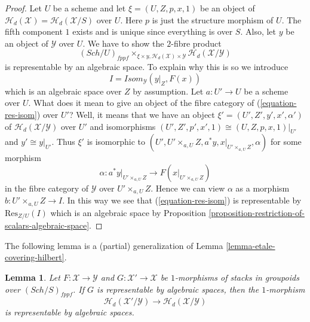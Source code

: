 \documentclass{stacks-project}
\theoremstyle{plain}
\newtheorem{lemma}[subsection]{Lemma}
\theoremstyle{definition}
\theoremstyle{remark}
\numberwithin{equation}{subsection}
\def\Sch{\mathit{Sch}}
\begin{document}
\begin{proof}
Let $U$ be a scheme and let $\xi = (U, Z, p, x, 1)$ be an object of
$\mathcal{H}_d(\mathcal{X}) = \mathcal{H}_d(\mathcal{X}/S)$ over $U$.
Here $p$ is just the structure morphism of $U$.
The fifth component $1$ exists and is unique
since everything is over $S$.
Also, let $y$ be an object of $\mathcal{Y}$ over $U$.
We have to show the $2$-fibre product
\begin{equation}
\label{equation-res-isom}
(\Sch/U)_{fppf}
\times_{\xi \times y, \mathcal{H}_d(\mathcal{X}) \times \mathcal{Y}}
\mathcal{H}_d(\mathcal{X}/\mathcal{Y})
\end{equation}
is representable by an algebraic space. To explain why this is so
we introduce
$$
I = \mathit{Isom}_\mathcal{Y}(y|_Z, F(x))
$$
which is an algebraic space over $Z$ by assumption. Let $a : U' \to U$
be a scheme over $U$. What does it mean to give an object of the fibre
category of (\ref{equation-res-isom}) over $U'$? Well, it means that we
have an object $\xi' = (U', Z', y', x', \alpha')$ of
$\mathcal{H}_d(\mathcal{X}/\mathcal{Y})$ over $U'$ and isomorphisms
$(U', Z', p', x', 1) \cong (U, Z, p, x, 1)|_{U'}$ and
$y' \cong y|_{U'}$. Thus $\xi'$ is isomorphic to
$(U', U' \times_{a, U} Z, a^*y, x|_{U' \times_{a, U} Z}, \alpha)$
for some morphism
$$
\alpha :
a^*y|_{U' \times_{a, U} Z}
\longrightarrow
F(x|_{U' \times_{a, U} Z})
$$
in the fibre category of $\mathcal{Y}$ over $U' \times_{a, U} Z$. Hence
we can view $\alpha$ as a morphism $b : U' \times_{a, U} Z \to I$.
In this way we see that (\ref{equation-res-isom})
is representable by $\text{Res}_{Z/U}(I)$ which is an algebraic space by
Proposition \ref{proposition-restriction-of-scalars-algebraic-space}.
\end{proof}

\noindent
The following lemma is a (partial) generalization of
Lemma \ref{lemma-etale-covering-hilbert}.

\begin{lemma}
\label{lemma-representable-on-top}
Let $F : \mathcal{X} \to \mathcal{Y}$ and $G : \mathcal{X}' \to \mathcal{X}$
be $1$-morphisms of stacks in groupoids over $(\Sch/S)_{fppf}$.
If $G$ is representable by algebraic spaces, then the $1$-morphism
$$
\mathcal{H}_d(\mathcal{X}'/\mathcal{Y})
\longrightarrow
\mathcal{H}_d(\mathcal{X}/\mathcal{Y})
$$
is representable by algebraic spaces.
\end{lemma}
\end{document}
